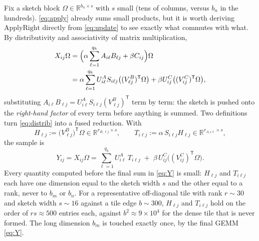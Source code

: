 \documentclass[11pt]{article}
\newcommand{\R}{\mathbb{R}}
\newcommand{\T}{\mathsf{T}}
\begin{document}
Fix a sketch block $\Omega\in\R^{b_n\times s}$ with $s$ small (tens of
columns, versus $b_n$ in the hundreds). \eqref{eq:apply} already sums small
products, but it is worth deriving $\mathrm{ApplyRight}$ directly from
\eqref{eq:update} to see exactly what commutes with what. By distributivity
and associativity of matrix multiplication,
\begin{align}
X_{ij}\Omega
&=\Bigl(\alpha\sum_{\ell=1}^{q_k}A_{i\ell}B_{\ell j}+\beta C_{ij}\Bigr)\Omega
\notag\\
&=\alpha\sum_{\ell=1}^{q_k}U^A_{i\ell}S_{i\ell j}\bigl((V^B_{\ell j})^{\T}
\Omega\bigr)+\beta U^C_{ij}\bigl((V^C_{ij})^{\T}\Omega\bigr),
\label{eq:distrib}
\end{align}
substituting $A_{i\ell}B_{\ell j}=U^A_{i\ell}S_{i\ell j}(V^B_{\ell j})^{\T}$
term by term: the sketch is pushed onto the \emph{right-hand factor} of every
term before anything is summed. Two definitions turn \eqref{eq:distrib} into
a fused reduction. With
\begin{equation}
\label{eq:HT}
H_{\ell j}:=\bigl(V^B_{\ell j}\bigr)^{\T}\Omega\in\R^{r_{B,\ell j}\times s},
\qquad
T_{i\ell j}:=\alpha\,S_{i\ell j}H_{\ell j}\in\R^{r_{A,i\ell}\times s},
\end{equation}
the sample is
\begin{equation}
\label{eq:Y}
Y_{ij}=X_{ij}\Omega=\sum_{\ell=1}^{q_k}U^A_{i\ell}\,T_{i\ell j}
\;+\;\beta\,U^C_{ij}\bigl((V^C_{ij})^{\T}\Omega\bigr).
\end{equation}
Every quantity computed before the final sum in \eqref{eq:Y} is small:
$H_{\ell j}$ and $T_{i\ell j}$ each have one dimension equal to the sketch
width $s$ and the other equal to a rank, never to $b_m$ or $b_n$. For a
representative off-diagonal tile with rank $r\sim30$ and sketch width
$s\sim16$ against a tile edge $b\sim300$, $H_{\ell j}$ and $T_{i\ell j}$ hold
on the order of $rs\approx500$ entries each, against $b^2\approx9\times10^4$
for the dense tile that is never formed. The long dimension $b_m$ is touched
exactly once, by the final GEMM \eqref{eq:Y}.
\end{document}
